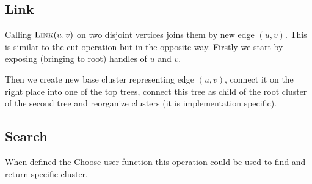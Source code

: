 
\subsection{Link}

Calling $\hbox{\sc Link}(u,v)$ on two disjoint vertices joins them by new edge $(u,v)$.
This is similar to the cut operation but in the opposite way. Firstly we start
by {\I exposing} (bringing to root) handles of $u$ and $v$.

Then we create new base cluster representing edge $(u,v)$, connect it on the
right place into one of the top trees, connect this tree as child of the root
cluster of the second tree and reorganize clusters (it is implementation
specific).


\subsection{Search}

When defined the {\I Choose} user function this operation could be used to find
and return specific cluster.

